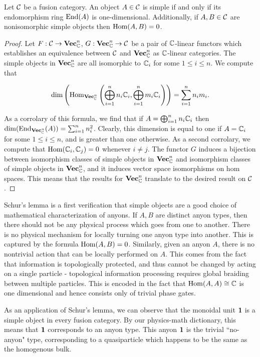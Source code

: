 \begin{prop} Let ${\mathcal C}$ be a fusion category. An object $A\in {\mathcal C}$ is simple if and only if its endomorphism ring $\operatorname{End}(A)$ is one-dimensional. Additionally, if $A,B\in {\mathcal C}$ are nonisomorphic simple objects then $\operatorname{Hom}(A,B)=0$.
\end{prop}
\begin{proof} Let $F:{\mathcal C}\to {\bf Vec}_{{\mathbb C}}^n$, $G:{\bf Vec}_{{\mathbb C}}^n\to {\mathcal C}$ be a pair of ${\mathbb C}$-linear functors which establishes an equivalence between ${\mathcal C}$ and ${\bf Vec}_{{\mathbb C}}^n$ as ${\mathbb C}$-linear categories. The simple objects in ${\bf Vec}_{{\mathbb C}}^n$ are all isomorphic to ${\mathbb C}_i$ for some $1\leq i \leq n$. We compute that

$$\dim\left(\operatorname{Hom}_{{\bf Vec}_{{\mathbb C}}^n}\left(\bigoplus_{i=1}^n n_i {\mathbb C}_i , \bigoplus_{i=1}^n m_i {\mathbb C}_i\right)\right)=\sum_{i=1}^n n_im_i.$$

As a corrolary of this formula, we find that if $A=\bigoplus_{i=1}^n n_i{\mathbb C}_i$ then $\dim(\operatorname{End}_{{\bf Vec}_{{\mathbb C}}^n}(A))=\sum_{i=1}^nn_i^2$. Clearly, this dimension is equal to one if $A={\mathbb C}_i$ for some $1\leq i\leq n$, and is greater than one otherwise. As a second corrolary, we compute that $\operatorname{Hom}({\mathbb C}_i,{\mathbb C}_j)=0$ whenever $i\neq j$. The functor $G$ induces a bijection between isomorphism classes of simple objects in ${\bf Vec}_{{\mathbb C}}^n$ and isomorphism classes of simple objects in ${\bf Vec}_{{\mathbb C}}^n$, and it induces vector space isomorphisms on hom spaces. This means that the results for ${\bf Vec}_{{\mathbb C}}^n$ translate to the desired result on ${\mathcal C}$.
\end{proof}

\begin{rem}
Schur's lemma is a first verification that simple objects are a good choice of mathematical characterization of anyons. If $A,B$ are distinct anyon types, then there should not be any physical process which goes from one to another. There is no physical mechanism for locally turning one anyon type into another. This is captured by the formula $\operatorname{Hom}(A,B)=0$. Similarly, given an anyon $A$, there is no nontrivial action that can be locally performed on $A$. This comes from the fact that information is topologically protected, and thus cannot be changed by acting on a single particle - topological information processing requires global braiding between multiple particles. This is encoded in the fact that $\operatorname{Hom}(A,A)\cong {\mathbb C}$ is one dimensional and hence consists only of trivial phase gates.
\end{rem}

\begin{rem}
As an application of Schur's lemma, we can observe that the monoidal unit ${\mathbf 1}$ is a simple object in every fusion category. By our physics-math dictionary, this means that ${\mathbf 1}$ corresponds to an anyon type. This anyon ${\mathbf 1}$ is the trivial ``no-anyon" type, corresponding to a quasiparticle which happens to be the same as the homogenous bulk.
\end{rem}

